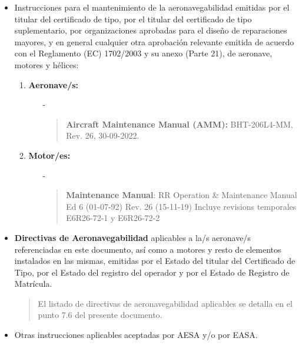 \documentclass[
]{article}
\begin{document}
\begin{itemize}
\item
  Instrucciones para el mantenimiento de la aeronavegabilidad emitidas
  por el titular del certificado de tipo, por el titular del certificado
  de tipo suplementario, por organizaciones aprobadas para el diseño de
  reparaciones mayores, y en general cualquier otra aprobación relevante
  emitida de acuerdo con el Reglamento (EC) 1702/2003 y su anexo (Parte
  21), de aeronave, motores y hélices:


  \begin{enumerate}
  \def\labelenumi{\arabic{enumi}.}
  \item
    \textbf{Aeronave/s:}

    \begin{itemize}
    \item[-]
      \begin{quote}
      \textbf{Aircraft Maintenance Manual (AMM):} BHT-206L4-MM, Rev. 26,
      30-09-2022.
      \end{quote}
    \end{itemize}

  
  \item  
    \textbf{Motor/es:}
    \begin{itemize}
    \item[-]
      \begin{quote}
      \textbf{Maintenance Manual}: RR Operation \& Maintenance Manual Ed 6
      (01-07-92) Rev. 26 (15-11-19) Incluye revisions temporales E6R26-72-1
      y E6R26-72-2
      \end{quote}
    \end{itemize}
  \end{enumerate}
\item
  \textbf{Directivas de Aeronavegabilidad} aplicables a la/s
  aeronave/s referenciadas en este documento, así como a motores y
  resto de elementos instalados en las mismas, emitidas por el Estado
  del titular del Certificado de Tipo, por el Estado del registro del
  operador y por el Estado de Registro de Matrícula.

  \begin{quote}
  El listado de directivas de aeronavegabilidad aplicables se detalla en
  el punto 7.6 del presente documento.
  \end{quote}

  \newpage

\item
  Otras instrucciones aplicables aceptadas por AESA y/o por EASA.
\end{itemize}
\end{document}
